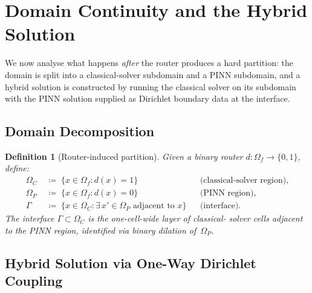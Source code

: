 \documentclass[11pt]{article}
\newtheorem{definition}[theorem]{Definition}
\begin{document}
\section{Domain Continuity and the Hybrid Solution}
\label{sec:continuity}

We now analyse what happens \emph{after} the router produces a hard partition: the
domain is split into a classical-solver subdomain and a PINN subdomain, and a
hybrid solution is constructed by running the classical solver on its subdomain
with the PINN solution supplied as Dirichlet boundary data at the interface.

\subsection{Domain Decomposition}

\begin{definition}[Router-induced partition]\label{def:partition}
Given a binary router $d \colon \Omega_f \to \{0,1\}$, define:
\begin{align}
  \Omega_C &\;\coloneqq\; \{x \in \Omega_f : d(x) = 1\}
    && \text{(classical-solver region)}, \label{eq:omega-c}\\
  \Omega_P &\;\coloneqq\; \{x \in \Omega_f : d(x) = 0\}
    && \text{(PINN region)}, \label{eq:omega-p}\\
  \Gamma &\;\coloneqq\; \{x \in \Omega_C :
    \exists\, x' \in \Omega_P \text{ adjacent to } x\}
    && \text{(interface)}. \label{eq:gamma}
\end{align}
The interface $\Gamma \subset \Omega_C$ is the one-cell-wide layer of classical-
solver cells adjacent to the PINN region, identified via binary dilation
of~$\Omega_P$.
\end{definition}

\subsection{Hybrid Solution via One-Way Dirichlet Coupling}
\end{document}
